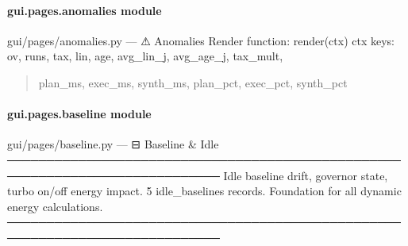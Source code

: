 \documentclass[letterpaper,10pt,english]{sphinxmanual}
\begin{document}
\paragraph{gui.pages.anomalies module}
\label{\detokenize{gui.pages.anomalies:module-gui.pages.anomalies}}\label{\detokenize{gui.pages.anomalies:gui-pages-anomalies-module}}\label{\detokenize{gui.pages.anomalies::doc}}
\sphinxAtStartPar
gui/pages/anomalies.py  —  ⚠  Anomalies
Render function: render(ctx)
ctx keys: ov, runs, tax, lin, age, avg\_lin\_j, avg\_age\_j, tax\_mult,
\begin{quote}

\sphinxAtStartPar
plan\_ms, exec\_ms, synth\_ms, plan\_pct, exec\_pct, synth\_pct
\end{quote}

\begin{fulllineitems}
\label{\detokenize{gui.pages.anomalies:gui.pages.anomalies.render}}
\pysigstartsignatures
\pysiglinewithargsret
{}
{}
{}
\pysigstopsignatures
\end{fulllineitems}


\sphinxstepscope


\paragraph{gui.pages.baseline module}
\label{\detokenize{gui.pages.baseline:module-gui.pages.baseline}}\label{\detokenize{gui.pages.baseline:gui-pages-baseline-module}}\label{\detokenize{gui.pages.baseline::doc}}
\sphinxAtStartPar
gui/pages/baseline.py  —  ⊟  Baseline \& Idle
─────────────────────────────────────────────────────────────────────────────
Idle baseline drift, governor state, turbo on/off energy impact.
5 idle\_baselines records. Foundation for all dynamic energy calculations.
─────────────────────────────────────────────────────────────────────────────
\end{document}
